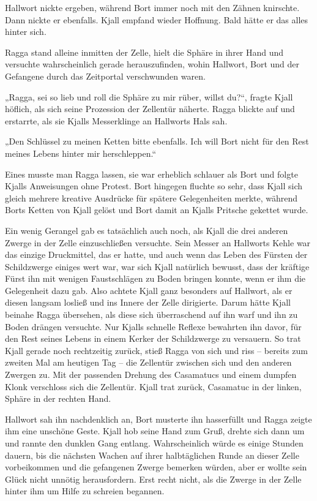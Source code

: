 Hallwort nickte ergeben, während Bort immer noch mit den Zähnen knirschte. Dann nickte er ebenfalls. Kjall empfand wieder Hoffnung. Bald hätte er das alles hinter sich.\bigskip



Ragga stand alleine inmitten der Zelle, hielt die Sphäre in ihrer Hand und versuchte wahrscheinlich gerade herauszufinden, wohin Hallwort, Bort und der Gefangene durch das Zeitportal verschwunden waren.

„Ragga, sei so lieb und roll die Sphäre zu mir rüber, willst du?“, fragte Kjall höflich, als sich seine Prozession der Zellentür näherte. Ragga blickte auf und erstarrte, als sie Kjalls Messerklinge an Hallworts Hals sah.

„Den Schlüssel zu meinen Ketten bitte ebenfalls. Ich will Bort nicht für den Rest meines Lebens hinter mir herschleppen.“

Eines musste man Ragga lassen, sie war erheblich schlauer als Bort und folgte Kjalls Anweisungen ohne Protest. Bort hingegen fluchte so sehr, dass Kjall sich gleich mehrere kreative Ausdrücke für spätere Gelegenheiten merkte, während Borts Ketten von Kjall gelöst und Bort damit an Kjalls Pritsche gekettet wurde.

Ein wenig Gerangel gab es tatsächlich auch noch, als Kjall die drei anderen Zwerge in der Zelle einzuschließen versuchte. Sein Messer an Hallworts Kehle war das einzige Druckmittel, das er hatte, und auch wenn das Leben des Fürsten der Schildzwerge einiges wert war, war sich Kjall natürlich bewusst, dass der kräftige Fürst ihn mit wenigen Faustschlägen zu Boden bringen konnte, wenn er ihm die Gelegenheit dazu gab. Also achtete Kjall ganz besonders auf Hallwort, als er diesen langsam losließ und ins Innere der Zelle dirigierte. Darum hätte Kjall beinahe Ragga übersehen, als diese sich überraschend auf ihn warf und ihn zu Boden drängen versuchte. Nur Kjalls schnelle Reflexe bewahrten ihn davor, für den Rest seines Lebens in einem Kerker der Schildzwerge zu versauern. So trat Kjall gerade noch rechtzeitig zurück, stieß Ragga von sich und riss – bereits zum zweiten Mal am heutigen Tag – die Zellentür zwischen sich und den anderen Zwergen zu. Mit der passenden Drehung des Casamatucs und einem dumpfen Klonk verschloss sich die Zellentür. Kjall trat zurück, Casamatuc in der linken, Sphäre in der rechten Hand.

Hallwort sah ihn nachdenklich an, Bort musterte ihn hasserfüllt und Ragga zeigte ihm eine unschöne Geste. Kjall hob seine Hand zum Gruß, drehte sich dann um und rannte den dunklen Gang entlang. Wahrscheinlich würde es einige Stunden dauern, bis die nächsten Wachen auf ihrer halbtäglichen Runde an dieser Zelle vorbeikommen und die gefangenen Zwerge bemerken würden, aber er wollte sein Glück nicht unnötig herausfordern. Erst recht nicht, als die Zwerge in der Zelle hinter ihm um Hilfe zu schreien begannen.

